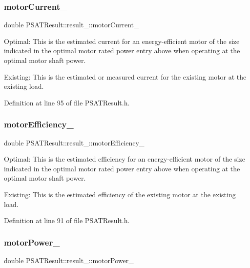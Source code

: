 \subsubsection{\texorpdfstring{motor\+Current\+\_\+}{motorCurrent\_}}
{\footnotesize\ttfamily double P\+S\+A\+T\+Result\+::result\+\_\+\+::motor\+Current\+\_\+}



Optimal\+: This is the estimated current for an energy-\/efficient motor of the size indicated in the optimal motor rated power entry above when operating at the optimal motor shaft power. 

Existing\+: This is the estimated or measured current for the existing motor at the existing load. 

Definition at line 95 of file P\+S\+A\+T\+Result.\+h.

\mbox{\label{struct_p_s_a_t_result_1_1result___a101600986354f5c1884169dc4486db9b}} 
\subsubsection{\texorpdfstring{motor\+Efficiency\+\_\+}{motorEfficiency\_}}
{\footnotesize\ttfamily double P\+S\+A\+T\+Result\+::result\+\_\+\+::motor\+Efficiency\+\_\+}



Optimal\+: This is the estimated efficiency for an energy-\/efficient motor of the size indicated in the optimal motor rated power entry above when operating at the optimal motor shaft power. 

Existing\+: This is the estimated efficiency of the existing motor at the existing load. 

Definition at line 91 of file P\+S\+A\+T\+Result.\+h.

\mbox{\label{struct_p_s_a_t_result_1_1result___ac86aa1d4cf0178d5a74bf3de0c673e8c}} 
\subsubsection{\texorpdfstring{motor\+Power\+\_\+}{motorPower\_}}
{\footnotesize\ttfamily double P\+S\+A\+T\+Result\+::result\+\_\+\+::motor\+Power\+\_\+}



